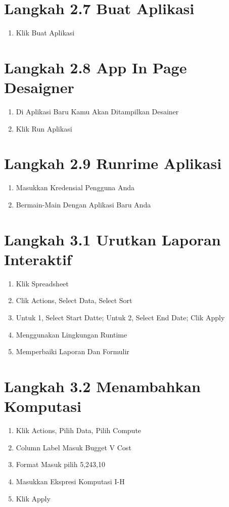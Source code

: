 \documentclass{article}
\begin{document}
\section{Langkah 2.7 Buat Aplikasi}
\begin{enumerate}
    \item 	Klik Buat Aplikasi
\end{enumerate}
\section{Langkah 2.8 App In Page Desaigner}
\begin{enumerate}
    \item 	Di Aplikasi Baru Kamu Akan Ditampilkan Desainer
\item	Klik Run Aplikasi

\end{enumerate}
\section{Langkah 2.9 Runrime Aplikasi}
\begin{enumerate}
    \item 	Masukkan Kredensial Pengguna Anda
\item	Bermain-Main Dengan Aplikasi Baru Anda

\end{enumerate}
\section{Langkah 3.1  Urutkan Laporan Interaktif}
\begin{enumerate}
    \item 	Klik Spreadsheet
\item	Clik Actions, Select Data, Select Sort
\item	Untuk 1, Select Start Datte; Untuk 2, Select End Date; Clik Apply
\item 	Menggunakan Lingkungan Runtime
\item	Memperbaiki Laporan Dan Formulir

\end{enumerate}
\section{Langkah 3.2 Menambahkan Komputasi}
\begin{enumerate}
    \item 	Klik Actions, Pilih Data, Pilih Compute
\item	Column Label Masuk Bugget V Cost
\item	Format Masuk pilih 5,243,10
\item Masukkan Ekspresi Komputasi I-H
\item Klik Apply
\end{enumerate}
\end{document}
